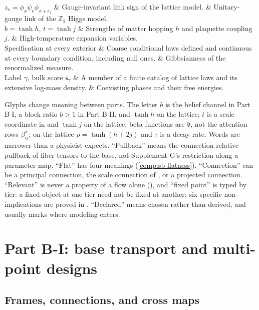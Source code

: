 \begin{decoder}
\(z_e=\phi_x\psi_e\phi_{x+e_\iota}\) & Gauge-invariant link sign of the lattice model. & Unitary-gauge
link of the \(\mathbb Z_2\) Higgs model. \\
\(b=\tanh h\), \(t=\tanh j\) & Strengths of matter hopping \(h\) and plaquette coupling \(j\). &
High-temperature expansion variables. \\
Specification at every exterior & Coarse conditional laws defined and continuous at every boundary
condition, including null ones. & Gibbsianness of the renormalized measure. \\
Label \(\gamma\), bulk score \(\mathsf s_\gamma\) & A member of a finite catalog of lattice laws and its
extensive log-mass density. & Coexisting phases and their free energies. \\
\end{decoder}

Glyphs change meaning between parts. The letter \(b\) is the belief channel in Part B-I, a block ratio
\(b>1\) in Part B-II, and \(\tanh h\) on the lattice; \(t\) is a scale coordinate in
 and \(\tanh j\) on the lattice; beta functions are \(\mathfrak b\), not the
attention rows \(\beta^x_{ij}\); on the lattice \(\rho=\tanh(h+2j)\) and \(\tau\) is a decay rate.
Words are narrower than a physicist expects. ``Pullback'' means the connection-relative pullback of
fiber tensors to the base, not Supplement G's restriction along a parameter map. ``Flat'' has four
meanings (\cref{comp:sb-flatness}). ``Connection'' can be a principal connection, the scale connection
of , or a projected connection. ``Relevant'' is never a property of a flow
alone (), and ``fixed point'' is typed by tier: a fixed object at one tier need
not be fixed at another; six specific non-implications are proved in
.
``Declared'' means chosen rather than derived, and usually marks where modeling enters.

\section{Part B-I: base transport and multi-point designs}
\label{comp:sb-base}

\subsection{Frames, connections, and cross maps}
\label{comp:sb-frames}

